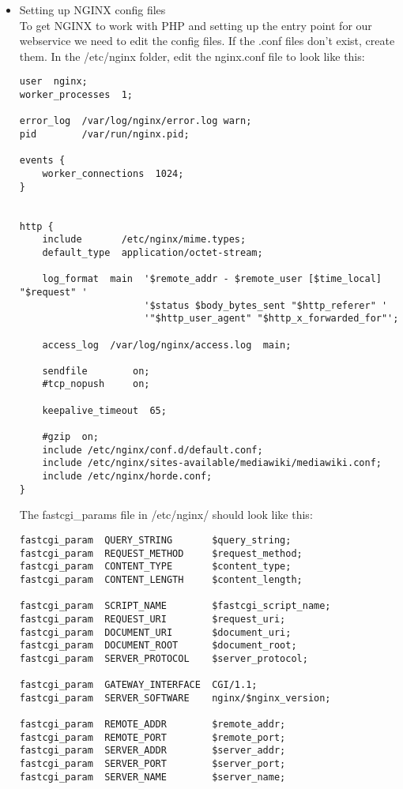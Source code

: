 \begin{itemize}
\item{Setting up NGINX config files}\\
To get NGINX to work with PHP and setting up the entry point for our webservice we need to edit the config files. If the .conf files don't exist, create them.
In the /etc/nginx folder, edit the nginx.conf file to look like this:
\begin{lstlisting}
user  nginx;
worker_processes  1;

error_log  /var/log/nginx/error.log warn;
pid        /var/run/nginx.pid;

events {
    worker_connections  1024;
}


http {
    include       /etc/nginx/mime.types;
    default_type  application/octet-stream;

    log_format  main  '$remote_addr - $remote_user [$time_local] "$request" '
                      '$status $body_bytes_sent "$http_referer" '
                      '"$http_user_agent" "$http_x_forwarded_for"';

    access_log  /var/log/nginx/access.log  main;

    sendfile        on;
    #tcp_nopush     on;

    keepalive_timeout  65;

    #gzip  on;
    include /etc/nginx/conf.d/default.conf;
    include /etc/nginx/sites-available/mediawiki/mediawiki.conf;
    include /etc/nginx/horde.conf;
}
\end{lstlisting}

The fastcgi\_params file in /etc/nginx/ should look like this:
\begin{lstlisting}
fastcgi_param  QUERY_STRING       $query_string;
fastcgi_param  REQUEST_METHOD     $request_method;
fastcgi_param  CONTENT_TYPE       $content_type;
fastcgi_param  CONTENT_LENGTH     $content_length;

fastcgi_param  SCRIPT_NAME        $fastcgi_script_name;
fastcgi_param  REQUEST_URI        $request_uri;
fastcgi_param  DOCUMENT_URI       $document_uri;
fastcgi_param  DOCUMENT_ROOT      $document_root;
fastcgi_param  SERVER_PROTOCOL    $server_protocol;

fastcgi_param  GATEWAY_INTERFACE  CGI/1.1;
fastcgi_param  SERVER_SOFTWARE    nginx/$nginx_version;

fastcgi_param  REMOTE_ADDR        $remote_addr;
fastcgi_param  REMOTE_PORT        $remote_port;
fastcgi_param  SERVER_ADDR        $server_addr;
fastcgi_param  SERVER_PORT        $server_port;
fastcgi_param  SERVER_NAME        $server_name;


\end{lstlisting}
\end{itemize}
